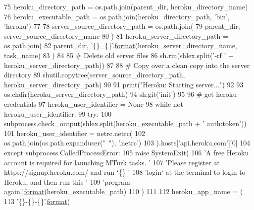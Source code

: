 \begin{DoxyCode}
75     heroku\_directory\_path = os.path.join(parent\_dir, heroku\_directory\_name)
76     heroku\_executable\_path = os.path.join(heroku\_directory\_path, \textcolor{stringliteral}{'bin'}, \textcolor{stringliteral}{'heroku'})
77 
78     server\_source\_directory\_path = os.path.join(
79         parent\_dir, server\_source\_directory\_name
80     )
81     heroku\_server\_directory\_path = os.path.join(
82         parent\_dir, \textcolor{stringliteral}{'\{\}\_\{\}'}.\hyperlink{namespaceparlai_1_1chat__service_1_1services_1_1messenger_1_1shared__utils_a32e2e2022b824fbaf80c747160b52a76}{format}(heroku\_server\_directory\_name, task\_name)
83     )
84 
85     \textcolor{comment}{# Delete old server files}
86     sh.rm(shlex.split(\textcolor{stringliteral}{'-rf '} + heroku\_server\_directory\_path))
87 
88     \textcolor{comment}{# Copy over a clean copy into the server directory}
89     shutil.copytree(server\_source\_directory\_path, heroku\_server\_directory\_path)
90 
91     print(\textcolor{stringliteral}{"Heroku: Starting server..."})
92 
93     os.chdir(heroku\_server\_directory\_path)
94     sh.git(\textcolor{stringliteral}{'init'})
95 
96     \textcolor{comment}{# get heroku credentials}
97     heroku\_user\_identifier = \textcolor{keywordtype}{None}
98     \textcolor{keywordflow}{while} \textcolor{keywordflow}{not} heroku\_user\_identifier:
99         \textcolor{keywordflow}{try}:
100             subprocess.check\_output(shlex.split(heroku\_executable\_path + \textcolor{stringliteral}{' auth:token'}))
101             heroku\_user\_identifier = netrc.netrc(
102                 os.path.join(os.path.expanduser(\textcolor{stringliteral}{"~"}), \textcolor{stringliteral}{'.netrc'})
103             ).hosts[\textcolor{stringliteral}{'api.heroku.com'}][0]
104         \textcolor{keywordflow}{except} subprocess.CalledProcessError:
105             \textcolor{keywordflow}{raise} SystemExit(
106                 \textcolor{stringliteral}{'A free Heroku account is required for launching MTurk tasks. '}
107                 \textcolor{stringliteral}{'Please register at https://signup.heroku.com/ and run `\{\} '}
108                 \textcolor{stringliteral}{'login` at the terminal to login to Heroku, and then run this '}
109                 \textcolor{stringliteral}{'program again.'}.\hyperlink{namespaceparlai_1_1chat__service_1_1services_1_1messenger_1_1shared__utils_a32e2e2022b824fbaf80c747160b52a76}{format}(heroku\_executable\_path)
110             )
111 
112     heroku\_app\_name = (
113         \textcolor{stringliteral}{'\{\}-\{\}-\{\}'}.\hyperlink{namespaceparlai_1_1chat__service_1_1services_1_1messenger_1_1shared__utils_a32e2e2022b824fbaf80c747160b52a76}{format}(

\end{DoxyCode}
